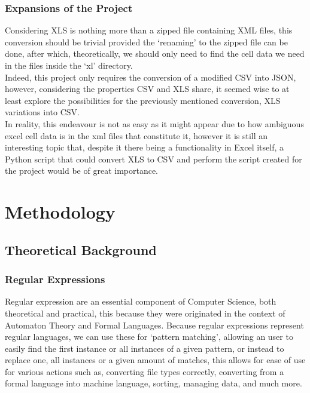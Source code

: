 \documentclass[11pt,a4paper,times]{report}
\begin{document}
\subsubsection*{Expansions of the Project}Considering XLS is nothing more
than a zipped file containing XML files, this conversion should be 
trivial provided the `renaming' to the zipped file can be done, after
which, theoretically, we should only need to find the cell data we need
in the files inside the `xl' directory.
\\
Indeed, this project only requires the conversion of a modified CSV into
JSON, however, considering the properties CSV and XLS share, it seemed
wise to at least explore the possibilities for the previously
mentioned conversion, XLS variations into CSV.
\\
In reality, this endeavour is not as easy as it might appear due to
how ambiguous excel cell data is in the xml files that constitute it,
however it is still an interesting topic that, despite it there being a
functionality in Excel itself, a Python script that could convert XLS to 
CSV and perform the script created for the project would be of 
great importance.

\section{Methodology} \label{methodology}
\subsection{Theoretical Background} \label{theory}
\subsubsection*{Regular Expressions}Regular expression are an essential
component of Computer Science, both theoretical and practical, this
because they were originated in the context of Automaton Theory and Formal Languages.   
Because regular expressions represent regular languages, we can use 
these for `pattern matching', allowing an user to easily find the first 
instance or all instances of a given pattern, or instead to replace one,
all instances or a given amount of matches, this allows for ease of use
for various actions such as, converting file types correctly, converting
from a formal language into machine language, sorting, managing data,
and much more.
\end{document}
